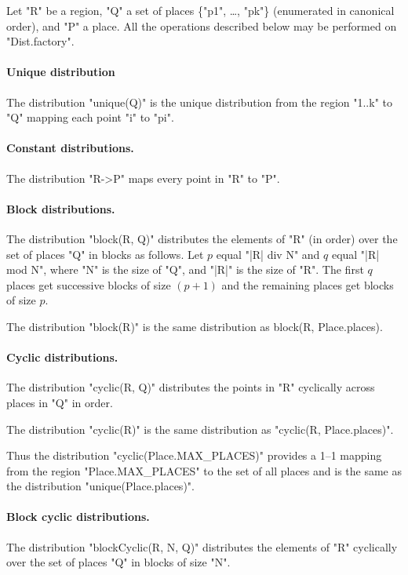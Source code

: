 Let \xcd"R" be a region, \xcd"Q" a set of places \{\xcd"p1", \dots, \xcd"pk"\}
(enumerated in canonical order), and \xcd"P" a place. All the operations
described below may be performed on \xcd"Dist.factory".

\paragraph{Unique distribution} 
The distribution \xcd"unique(Q)" is the unique distribution from the
region \xcd"1..k" to \xcd"Q" mapping each point \xcd"i" to \xcd"pi".

\paragraph{Constant distributions.} 
The distribution \xcd"R->P" maps every point in \xcd"R" to \xcd"P".

\paragraph{Block distributions.}
The distribution \xcd"block(R, Q)" distributes the elements of \xcd"R"
(in order) over the set of places \xcd"Q" in blocks  as
follows. Let $p$ equal \xcd"|R| div N" and $q$ equal \xcd"|R| mod N",
where \xcd"N" is the size of \xcd"Q", and 
\xcd"|R|" is the size of \xcd"R".  The first $q$ places get
successive blocks of size $(p+1)$ and the remaining places get blocks of
size $p$.

The distribution \xcd"block(R)" is the same distribution as {\cf
block(R, Place.places)}.

\paragraph{Cyclic distributions.} 
The distribution \xcd"cyclic(R, Q)" distributes the points in \xcd"R"
cyclically across places in \xcd"Q" in order.

The distribution \xcd"cyclic(R)" is the same distribution as \xcd"cyclic(R, Place.places)".

Thus the distribution \xcd"cyclic(Place.MAX_PLACES)" provides a 1--1
mapping from the region \xcd"Place.MAX_PLACES" to the set of all
places and is the same as the distribution \xcd"unique(Place.places)".

\paragraph{Block cyclic distributions.}
The distribution \xcd"blockCyclic(R, N, Q)" distributes the elements
of \xcd"R" cyclically over the set of places \xcd"Q" in blocks of size
\xcd"N".

